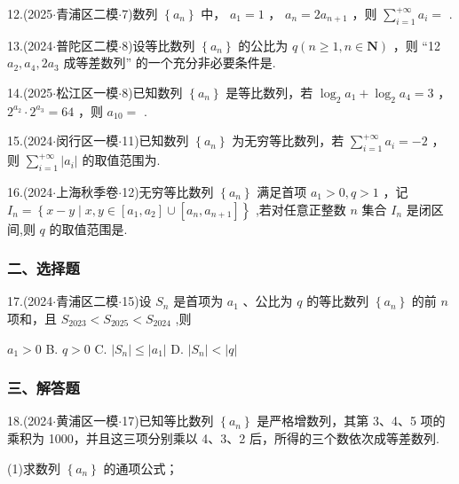 12.(2025$\cdot$青浦区二模$\cdot$7)数列 $\left\{  {a}_{n}\right\}$ 中， ${a}_{1} = 1$ ， ${a}_{n} = 2{a}_{n + 1}$ ，则 $\mathop{\sum }\limits_{{i = 1}}^{{+\infty }}{a}_{i} =$ \blkda[2]{}.

13.(2024$\cdot$普陀区二模$\cdot$8)设等比数列 $\left\{  {a}_{n}\right\}$ 的公比为 $q\left( {n \geq  1,n \in  \mathbf{N}}\right)$ ，则 “12 ${a}_{2},{a}_{4},2{a}_{3}$ 成等差数列” 的一个充分非必要条件是\blkda[2]{}.

14.(2025$\cdot$松江区一模$\cdot$8)已知数列 $\left\{  {a}_{n}\right\}$ 是等比数列，若 ${\log }_{2}{a}_{1} + {\log }_{2}{a}_{4} = 3$ ， ${{2}}^{{a}_{2}} \cdot  {2}^{{a}_{3}} = {64}$ ，则 ${a}_{10} =$ \blkda[2]{}.

15.(2024$\cdot$闵行区一模$\cdot$11)已知数列 $\left\{  {a}_{n}\right\}$ 为无穷等比数列，若 $\mathop{\sum }\limits_{{i = 1}}^{{+\infty }}{a}_{i} =  - 2$ ，则 $\mathop{\sum }\limits_{{i = 1}}^{{+\infty }}\left| {a}_{i}\right|$ 的取值范围为\blkda[2]{}.

16.(2024$\cdot$上海秋季卷$\cdot$12)无穷等比数列 $\left\{  {a}_{n}\right\}$ 满足首项 ${a}_{1} > 0,q > 1$ ，记 ${I}_{n} = \left\{  {x - y \mid  x,y \in  \left\lbrack  {{a}_{1},{a}_{2}}\right\rbrack   \cup  }\right.  \left. \left\lbrack  {{a}_{n},{a}_{n + 1}}\right\rbrack  \right\}$ ,若对任意正整数 $n$ 集合 ${I}_{n}$ 是闭区间,则 $q$ 的取值范围是\blkda[2]{}.

\subsubsection*{二、选择题}

17.(2024$\cdot$青浦区二模$\cdot$15)设 ${S}_{n}$ 是首项为 ${a}_{1}$ 、公比为 $q$ 的等比数列 $\left\{  {a}_{n}\right\}$ 的前 $n$ 项和，且 ${S}_{2023} <  {S}_{2025} < {S}_{2024}$ ,则 \dotfill{(\kh{})}

\xx{}{}{}{}${a}_{1} > 0$ B. $q > 0$ C. $\left| {S}_{n}\right|  \leq  \left| {a}_{1}\right|$ D. $\left| {S}_{n}\right|  < \left| q\right|$

\subsubsection*{三、解答题}

18.(2024$\cdot$黄浦区一模$\cdot$17)已知等比数列 $\left\{  {a}_{n}\right\}$ 是严格增数列，其第 3、4、5 项的乘积为 1000，并且这三项分别乘以 4、3、2 后，所得的三个数依次成等差数列.

(1)求数列 $\left\{  {a}_{n}\right\}$ 的通项公式；

